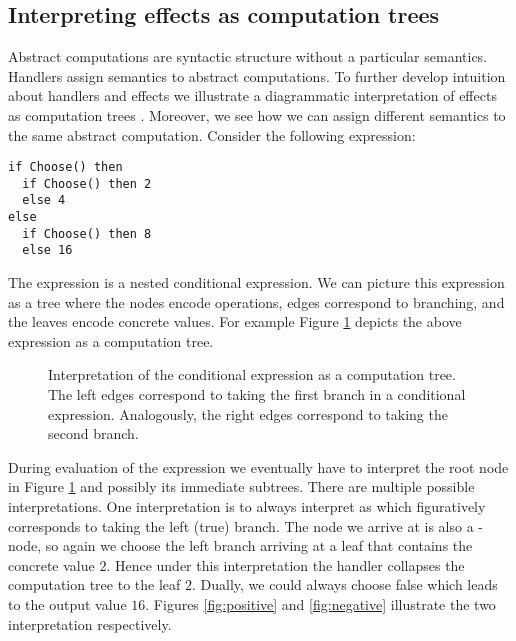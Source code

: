 \subsection{Interpreting effects as computation trees}
Abstract computations are syntactic structure without a particular semantics. Handlers assign semantics to abstract computations.
To further develop intuition about handlers and effects we illustrate a diagrammatic interpretation of effects as computation trees \cite{Lindley2014}. Moreover, we see how we can assign different semantics to the same abstract computation. Consider the following expression:
\begin{lstlisting}[style=ocaml]
if Choose() then
  if Choose() then 2
  else 4
else
  if Choose() then 8
  else 16 
\end{lstlisting}
The expression is a nested conditional expression.
We can picture this expression as a tree where the nodes encode operations, edges correspond to branching, and the leaves encode concrete values. For example Figure \ref{fig:condexp} depicts the above expression as a computation tree.
\begin{figure}[t]
\begin{center}
\end{center}\caption{Interpretation of the conditional expression as a computation tree. The left edges correspond to taking the first branch in a conditional expression. Analogously, the right edges correspond to taking the second branch.}\label{fig:condexp}
\end{figure}
During evaluation of the expression we eventually have to interpret the root node  in Figure \ref{fig:condexp} and possibly its immediate subtrees.
There are multiple possible interpretations. One interpretation is to always interpret  as  which figuratively corresponds to taking the left (true) branch. The node we arrive at is also a -node, so again we choose the left branch arriving at a leaf that contains the concrete value $2$. Hence under this interpretation the handler collapses the computation tree to the leaf $2$. Dually, we could always choose false which leads to the output value $16$. Figures \ref{fig:positive} and \ref{fig:negative} illustrate the two interpretation respectively.
